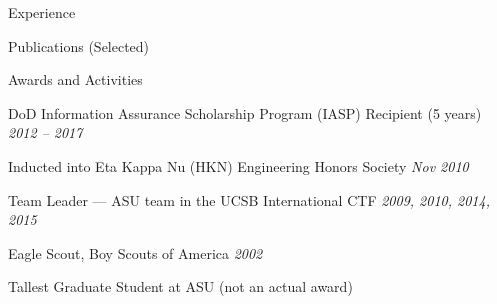 \documentclass[cvmode=false,font=cantarell,lastname=Mabey]{resume} %
\begin{document}




\begin{rSection}{Experience}

  

  



  


  

  

  


\end{rSection}


\begin{rSectionHeading}{Publications (Selected)}
\end{rSectionHeading}



% 


\begin{rBulletSection}{Awards and Activities}

  \item DoD Information Assurance Scholarship Program (IASP) Recipient (5 years) \hfill \emph{2012 -- 2017}

  \item Inducted into Eta Kappa Nu (HKN) Engineering Honors Society \hfill \emph{Nov 2010}

  \item Team Leader --- ASU team in the UCSB International CTF \hfill \emph{2009, 2010, 2014, 2015}

  \item Eagle Scout, Boy Scouts of America \hfill \emph{2002}

  \item Tallest Graduate Student at ASU \hfill (not an actual award)

\end{rBulletSection}
\end{document}
